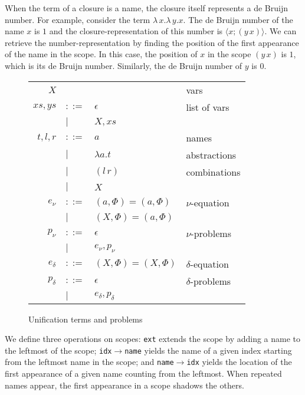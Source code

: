 \documentclass[a4paper,UKenglish]{lipics-v2016}
\newcommand{\clos}[2] {
  \langle #1; #2 \rangle
}
\newcommand{\app}[2] {
  (#1\, #2)
}
\begin{document}
When the term of a closure is a name, the closure itself represents a
de Bruijn number.  For example, consider the term
$\lambda\,x.\lambda\,y.x$. The de Bruijn number of the name $x$ is $1$
and the closure-representation of this number is $\clos{x}{(y\,x)}$.
We can retrieve the number-representation by finding the position of
the first appearance of the name in the scope. In this case, the
position of $x$ in the scope $(y\,x)$ is $1$, which is its de Bruijn
number. Similarly, the de Bruijn number of $y$ is $0$.

\begin{wrapfigure}{r}{0.5\textwidth}
  \caption{Unification terms and problems\label{table:new-terms}}
    \begin{tabular}{r l l l}  
    $X$   &       &     & vars \\
      $xs,ys$ & $::=$ & $\epsilon$& list of vars \\
      & $|$&  $X,xs$ &  \\
    $t,l,r$ & $::=$ & $a$ & names \\
    & $|$ & $\lambda a.t$ & abstractions \\
    & $|$ & $\app{l}{r}$ & combinations \\
      & $|$ & $X$ & \\
      $e_\nu$  & $::=$ & $(a,\Phi) = (a,\Phi)$ & $\nu$-equation \\
           & $|$ &  $(X,\Phi) = (a,\Phi)$ \\
      $p_\nu$  & $::=$ & $\epsilon$ & $\nu$-problems \\
           & $|$ & $e_\nu, p_\nu$ \\
      $e_\delta$  & $::=$& $(X,\Phi) = (X,\Phi)$ & $\delta$-equation \\
      $p_\delta$  & $::=$ & $\epsilon$ & $\delta$-problems \\
           & $|$ & $e_\delta, p_\delta$
    \end{tabular}
\end{wrapfigure}

We define three operations on scopes: \texttt{ext}
extends the scope by adding a name to the leftmost of the scope;
\texttt{idx$\rightarrow$name} yields the name of a given index
starting from the leftmost name in the scope; and
\texttt{name$\rightarrow$idx} yields the location of the first
appearance of a given name counting from the leftmost.
When repeated names appear, the
first appearance in a scope shadows the others.
\end{document}
